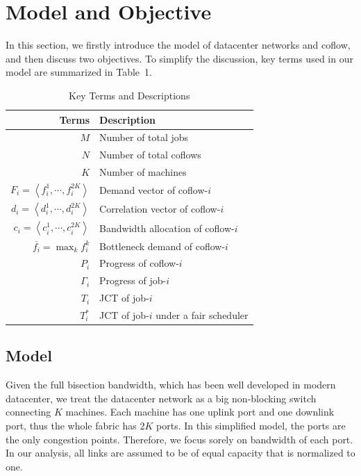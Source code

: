 \documentclass[10pt, conference, letterpaper]{IEEEtran}
\begin{document}
\section{Model and Objective}\label{model}
In this section, we firstly introduce the model of datacenter networks and coflow, and then discuss two objectives. To simplify the discussion, key terms used in our model are summarized in Table~1.
\begin{table}
\caption{Key Terms and Descriptions}
\begin{center}
\begin{tabular}{|r|l|}
\hline
Terms & Description\\
\hline
$M$ & Number of total jobs\\
\hline
$N$ & Number of total coflows\\
\hline
$K$ & Number of machines\\
\hline
$F_i = \left\langle f_i^1,\cdots,f_i^{2K}\right\rangle$ & Demand vector of coflow-$i$\\
\hline
$d_i = \left\langle d_i^1,\cdots,d_i^{2K}\right\rangle$ & Correlation vector of coflow-$i$\\
\hline
$c_i=\left\langle c_i^1,\cdots,c_i^{2K}\right\rangle$ & Bandwidth allocation of coflow-$i$\\
\hline
$\overline{f_i}=\max_{k} f_i^k$ & Bottleneck demand of coflow-$i$\\
\hline
$P_i$ & Progress of coflow-$i$\\
\hline
$\Gamma_i$ & Progress of job-$i$\\
\hline
$T_i$ & JCT of job-$i$\\
\hline
$T_i^*$ & JCT of job-$i$ under a fair scheduler\\
\hline
\end{tabular}
\end{center}
\end{table}

\subsection{Model}
Given the full bisection bandwidth, which has been well developed in modern datacenter\cite{jupiter}, we treat the datacenter network as a big non-blocking switch connecting $K$ machines. Each machine has one uplink port and one downlink port, thus the whole fabric has $2K$ ports. In this simplified model, the ports are the only congestion points. Therefore, we focus sorely on bandwidth of each port. In our analysis, all links are assumed to be of equal capacity that is normalized to one.
\end{document}
